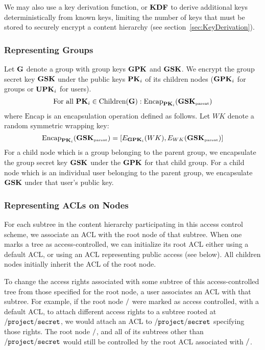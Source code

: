 We may also use a key derivation function, or ${\textbf{KDF}}$ to derive
additional keys deterministically from known keys, limiting the number
of keys that must be stored to securely encrypt a content hierarchy
(see section~\ref{sec:KeyDerivation}).

\subsubsection{Representing Groups}

Let ${\textbf{G}}$ denote a group with group keys ${\textbf{GPK}}$ and ${\textbf{GSK}}$. We encrypt
the group secret key ${\textbf{GSK}}$ under the public keys ${\textbf{PK}}_i$ of its
children nodes (${\textbf{GPK}}_i$ for groups or ${\textbf{UPK}}_i$ for users).
$$\mbox{For all } {\textbf{PK}}_i \in \mbox{Children}({\textbf{G}}): \mbox{Encap}_{{\textbf{PK}}_i}({\textbf{GSK}}_{\mbox{\tiny parent}})$$
where $\mbox{Encap}$ is an encapsulation operation defined as follows. Let $WK$ denote a random symmetric wrapping key:
$$\mbox{Encap}_{{\textbf{PK}}_i}({\textbf{GSK}}_{\mbox{\tiny parent}}) = [E_{{\textbf{GPK}}_i}(WK), E_{WK}({\textbf{GSK}}_{\mbox{\tiny parent}})]$$
For a child node which is a group belonging to the parent group, we
encapsulate the group secret key ${\textbf{GSK}}$ under the ${\textbf{GPK}}$ for that
child group. For a child node which is an individual user belonging to
the parent group, we encapsulate ${\textbf{GSK}}$ under that user's public key.

\subsubsection{Representing ACLs on Nodes}

For each subtree in the content hierarchy participating in this access
control scheme, we associate an ACL with the root node of that
subtree. When one marks a tree as access-controlled, we can initialize
its root ACL either using a default ACL, or using an ACL representing
public access (see below). All children nodes initially inherit the
ACL of the root node.

To change the access rights associated with some subtree of this
access-controlled tree from those specified for the root node, a user
associates an ACL with that subtree. For example, if the root node
$\ndnxpath{/}$ were marked as access controlled, with a default ACL,
to attach different access rights to a subtree rooted at
$\ndnxpath{/project/secret}$, we would attach an ACL to
$\ndnxpath{/project/secret}$ specifying those rights. The root node
$\ndnxpath{/}$, and all of its subtrees other than
$\ndnxpath{/project/secret}$ would still be controlled by the root ACL
associated with $\ndnxpath{/}$.

